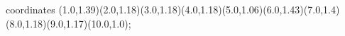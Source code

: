 					coordinates { (1.0,1.39)(2.0,1.18)(3.0,1.18)(4.0,1.18)(5.0,1.06)(6.0,1.43)(7.0,1.4)(8.0,1.18)(9.0,1.17)(10.0,1.0)};